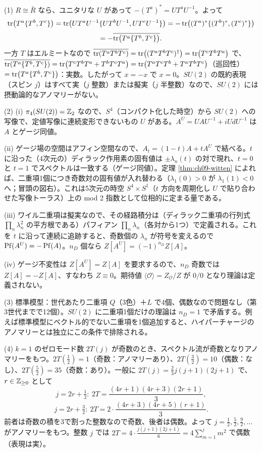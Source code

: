 \begin{solution}
(1) $R\cong\bar R$ なら、ユニタリな $U$ があって $-(T^a)^*=UT^aU^{-1}$。よって
\[
\tr\bigl(T^a\{T^b,T^c\}\bigr)=\tr\bigl(UT^aU^{-1}\{UT^bU^{-1},UT^cU^{-1}\}\bigr)=-\tr\bigl((T^a)^*\{(T^b)^*,(T^c)^*\}\bigr)
\]
\[
=-\overline{\tr\bigl(T^a\{T^b,T^c\}\bigr)} .
\]
一方 $T$ はエルミートなので $\overline{\tr(T^aT^bT^c)}=\tr((T^aT^bT^c)^\dagger)=\tr(T^cT^bT^a)$ で、$\overline{\tr(T^a\{T^b,T^c\})}=\tr(T^cT^bT^a+T^bT^cT^a)=\tr(T^aT^cT^b+T^aT^bT^c)$（巡回性）$=\tr(T^a\{T^b,T^c\})$：実数。したがって $x=-x$ で $x=0$。$SU(2)$ の既約表現（スピン $j$）はすべて実（$j$ 整数）または擬実（$j$ 半整数）なので、$SU(2)$ には摂動論的なアノマリーがない。

(2) (i) $\pi_4(SU(2))=\mathbb{Z}_2$ なので、$S^4$（コンパクト化した時空）から $SU(2)$ への写像で、定値写像に連続変形できないもの $U$ がある。$A^U=UAU^{-1}+iUdU^{-1}$ は $A$ とゲージ同値。

(ii) ゲージ場の空間はアフィン空間なので、$A_t=(1-t)A+tA^U$ で結べる。$t$ に沿った（4次元の）ディラック作用素の固有値は $\pm\lambda_n(t)$ の対で現れ、$t=0$ と $t=1$ でスペクトルは一致する（ゲージ同値）。定理 \ref{thm:ch09-witten} によれば、二重項1個につき奇数対の固有値が入れ替わる（$\lambda_1(0)>0$ が $\lambda_1(1)<0$ へ；冒頭の図右）。これは5次元の時空 $S^4\times S^1$（$t$ 方向を周期化し $U$ で貼り合わせた写像トーラス）上の mod 2 指数として位相的に定まる量である。

(iii) ワイル二重項は擬実なので、その経路積分は（ディラック二重項の行列式 $\prod_n\lambda_n^2$ の平方根である）パフィアン $\prod_n\lambda_n$（各対から1つ）で定義される。これを $t$ に沿って連続に追跡すると、奇数個の $\lambda_n$ が符号を変えるので $\operatorname{Pf}(A^U)=-\operatorname{Pf}(A)$。$n_D$ 個なら $Z[A^U]=(-1)^{n_D}Z[A]$。

(iv) ゲージ不変性は $Z[A^U]=Z[A]$ を要求するので、$n_D$ 奇数では $Z[A]=-Z[A]$、すなわち $Z\equiv0$。期待値 $\langle\mathcal O\rangle=Z_{\mathcal O}/Z$ が $0/0$ となり理論は定義されない。

(3) 標準模型：世代あたり二重項 $Q$（3色）＋$L$ で4個、偶数なので問題なし（第3世代までで12個）。$SU(2)$ に二重項1個だけの理論は $n_D=1$ で矛盾する。例えば標準模型にベクトル的でない二重項を1個追加すると、ハイパーチャージのアノマリーとは独立にこの条件で排除される。

(4) $k=1$ のゼロモード数 $2T(j)$ が奇数のとき、スペクトル流が奇数となりアノマリーをもつ。$2T(\frac12)=1$（奇数：アノマリーあり）、$2T(\frac32)=10$（偶数：なし）、$2T(\frac52)=35$（奇数：あり）。一般に $2T(j)=\frac23j(j+1)(2j+1)$ で、$r\in\mathbb{Z}_{\ge0}$ として
\[
j=2r+\tfrac12:\ 2T=\frac{(4r+1)(4r+3)(2r+1)}{3},
\]
\[
j=2r+\tfrac32:\ 2T=2\cdot\frac{(4r+3)(4r+5)(r+1)}{3}.
\]
前者は奇数の積を3で割った整数なので奇数、後者は偶数。よって $j=\frac12,\frac52,\frac92,\dots$ がアノマリーをもつ。整数 $j$ では $2T=4\cdot\frac{j(j+1)(2j+1)}{6}=4\sum_{m=1}^jm^2$ で偶数（表現は実）。


\end{solution}
